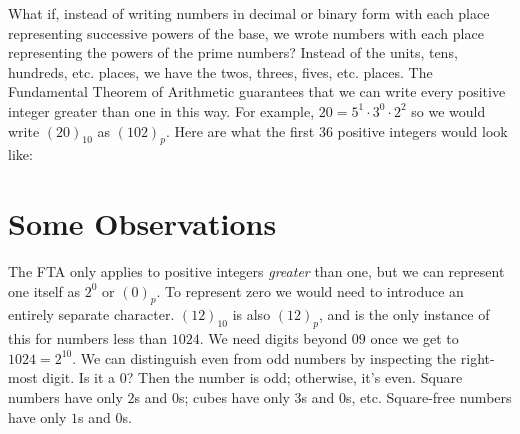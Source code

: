 \documentclass[12pt]{article}
\newcommand{\ppn}[1]{(#1)_p}
\begin{document}
\noindent What if, instead of writing numbers in decimal or binary form with each place representing successive powers of the base, we wrote numbers with each place representing the powers of the prime numbers? Instead of the units, tens, hundreds, etc. places, we have the twos, threes, fives, etc. places. The Fundamental Theorem of Arithmetic guarantees that we can write every positive integer greater than one in this way. For example, $20 = 5^1 \cdot 3^0 \cdot 2^2$ so we would write $(20)_{10}$ as $\ppn{102}$. Here are what the first 36 positive integers would look like:

\ttfamily \small
{}
\normalfont \normalsize

\section*{Some Observations}
The FTA only applies to positive integers \textit{greater} than one, but we can represent one itself as $2^0$ or $\ppn{0}$. To represent zero we would need to introduce an entirely separate character. $(12)_{10}$ is also $\ppn{12}$, and is the only instance of this for numbers less than $1024$. We need digits beyond $0$\textendash$9$ once we get to $1024 = 2^{10}$. We can distinguish even from odd numbers by inspecting the right-most digit. Is it a $0$? Then the number is odd; otherwise, it's even. Square numbers have only $2$s and $0$s; cubes have only $3$s and $0$s, etc. Square-free numbers have only $1$s and $0$s.
\end{document}
